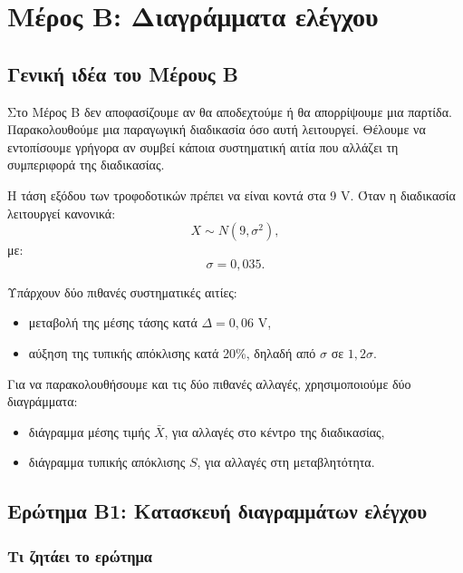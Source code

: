 \documentclass[12pt,a4paper]{article}
\begin{document}
\newpage

\section{Μέρος Β: Διαγράμματα ελέγχου}

\subsection{Γενική ιδέα του Μέρους Β}

Στο Μέρος Β δεν αποφασίζουμε αν θα αποδεχτούμε ή θα απορρίψουμε μια παρτίδα.
Παρακολουθούμε μια παραγωγική διαδικασία όσο αυτή λειτουργεί. Θέλουμε να
εντοπίσουμε γρήγορα αν συμβεί κάποια συστηματική αιτία που αλλάζει τη
συμπεριφορά της διαδικασίας.

Η τάση εξόδου των τροφοδοτικών πρέπει να είναι κοντά στα 9 V. Όταν η διαδικασία
λειτουργεί κανονικά:
\[
    X\sim N(9,\sigma^2),
\]
με:
\[
    \sigma=0{,}035.
\]

Υπάρχουν δύο πιθανές συστηματικές αιτίες:

\begin{itemize}
    \item μεταβολή της μέσης τάσης κατά \(\Delta=0{,}06\) V,
    \item αύξηση της τυπικής απόκλισης κατά 20\%, δηλαδή από \(\sigma\) σε
    \(1{,}2\sigma\).
\end{itemize}

Για να παρακολουθήσουμε και τις δύο πιθανές αλλαγές, χρησιμοποιούμε δύο
διαγράμματα:

\begin{itemize}
    \item διάγραμμα μέσης τιμής \(\bar X\), για αλλαγές στο κέντρο της
    διαδικασίας,
    \item διάγραμμα τυπικής απόκλισης \(S\), για αλλαγές στη μεταβλητότητα.
\end{itemize}

\subsection{Ερώτημα Β1: Κατασκευή διαγραμμάτων ελέγχου}

\subsubsection*{Τι ζητάει το ερώτημα}
\end{document}
